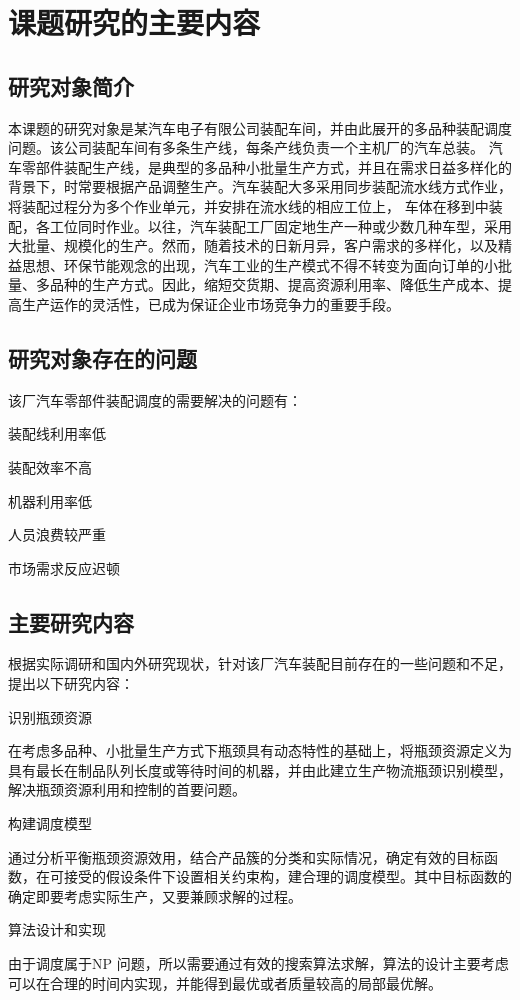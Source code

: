 \chapter{课题研究的主要内容}
\section{研究对象简介}
本课题的研究对象是某汽车电子有限公司装配车间，并由此展开的多品种装配调度问题。该公司装配车间有多条生产线，每条产线负责一个主机厂的汽车总装。
汽车零部件装配生产线，是典型的多品种小批量生产方式，并且在需求日益多样化的背景下，时常要根据产品调整生产。汽车装配大多采用同步装配流水线方式作业，将装配过程分为多个作业单元，并安排在流水线的相应工位上，
车体在移到中装配，各工位同时作业。以往，汽车装配工厂固定地生产一种或少数几种车型，采用大批量、规模化的生产。然而，随着技术的日新月异，客户需求的多样化，以及精益思想、环保节能观念的出现，汽车工业的生产模式不得不转变为面向订单的小批量、多品种的生产方式。因此，缩短交货期、提高资源利用率、降低生产成本、提高生产运作的灵活性，已成为保证企业市场竞争力的重要手段。

\section{研究对象存在的问题}
该厂汽车零部件装配调度的需要解决的问题有：
\begin{asparaenum}[(1)]
\item 装配线利用率低
\item 装配效率不高
\item 机器利用率低
\item 人员浪费较严重
\item 市场需求反应迟顿
\end{asparaenum}

\section{主要研究内容}
根据实际调研和国内外研究现状，针对该厂汽车装配目前存在的一些问题和不足，提出以下研究内容：
\renewcommand{\labelenumi}{(\theenumi)}
\begin{asparaenum}
\item 识别瓶颈资源

在考虑多品种、小批量生产方式下瓶颈具有动态特性的基础上，将瓶颈资源定义为具有最长在制品队列长度或等待时间的机器，并由此建立生产物流瓶颈识别模型，解决瓶颈资源利用和控制的首要问题。
\item 构建调度模型

通过分析平衡瓶颈资源效用，结合产品簇的分类和实际情况，确定有效的目标函数，在可接受的假设条件下设置相关约束构，建合理的调度模型。其中目标函数的确定即要考虑实际生产，又要兼顾求解的过程。
\item 算法设计和实现
\end{asparaenum}

由于调度属于NP 问题，所以需要通过有效的搜索算法求解，算法的设计主要考虑可以在合理的时间内实现，并能得到最优或者质量较高的局部最优解。